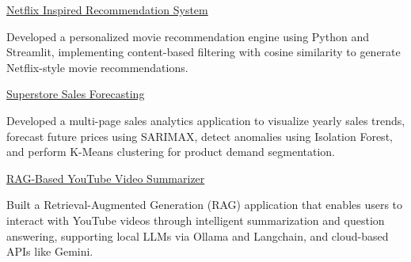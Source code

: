 
\begin{cventries}

  \cventry
    {}
    {\href{https://github.com/ProfessionalPallav20014/Netflix-Inspired-Recommendation-System}
    {Netflix Inspired Recommendation System}}
    {}
    {}
    {
      \begin{cvitems}
        \item {Developed a personalized movie recommendation engine using Python and Streamlit, implementing content-based filtering with cosine similarity to generate Netflix-style movie recommendations.}
      \end{cvitems}
    }

  \vspace{2mm}

  \cventry
    {}
    {\href{https://github.com/ProfessionalPallav20014/Sales-Forecasting-PallavDas}
    {Superstore Sales Forecasting}}
    {}
    {}
    {
      \begin{cvitems}
        \item {Developed a multi-page sales analytics application to visualize yearly sales trends, forecast future prices using SARIMAX, detect anomalies using Isolation Forest, and perform K-Means clustering for product demand segmentation.}
      \end{cvitems}
    }

  \vspace{2mm}

  \cventry
    {}
    {\href{https://github.com/ProfessionalPallav20014/RAG-Powered-YT-Summarizer}
    {RAG-Based YouTube Video Summarizer}}
    {}
    {}
    {
      \begin{cvitems}
        \item {Built a Retrieval-Augmented Generation (RAG) application that enables users to interact with YouTube videos through intelligent summarization and question answering, supporting local LLMs via Ollama and Langchain, and cloud-based APIs like Gemini.}
      \end{cvitems}
    }
\end{cventries}